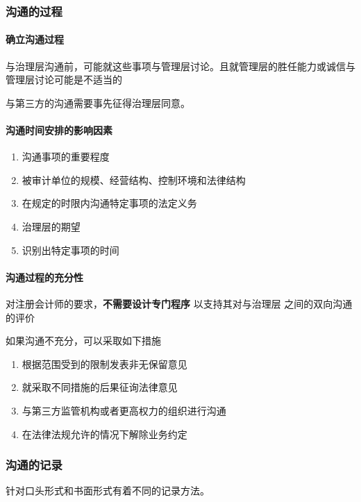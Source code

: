 \documentclass[UTF8,12pt]{ctexart}
\numberwithin{equation}{section} %
\numberwithin{figure}{section}
\numberwithin{table}{section}
\begin{document}
	\subsubsection{沟通的过程}
	\paragraph{确立沟通过程}
	与治理层沟通前，可能就这些事项与管理层讨论。且就管理层的胜任能力或诚信与管理层讨论可能是不适当的
	
	与第三方的沟通需要事先征得治理层同意。
	
	\paragraph{沟通时间安排的影响因素}
	\begin{enumerate}
		\item 沟通事项的重要程度
		
		\item 被审计单位的规模、经营结构、控制环境和法律结构   
		
		\item 在规定的时限内沟通特定事项的法定义务
		
		\item 治理层的期望
		
		\item 识别出特定事项的时间
	\end{enumerate}
	
	
	\paragraph{沟通过程的充分性}
	对注册会计师的要求，\textbf{不需要设计专门程序}  以支持其对与治理层 之间的双向沟通的评价
	
	如果沟通不充分，可以采取如下措施
	\begin{enumerate}
		\item 根据范围受到的限制发表非无保留意见
		
		\item 就采取不同措施的后果征询法律意见
		
		\item 与第三方监管机构或者更高权力的组织进行沟通
		
		\item 在法律法规允许的情况下解除业务约定
	\end{enumerate}
	
	
	
	\subsubsection{沟通的记录}
	针对口头形式和书面形式有着不同的记录方法。
	
\end{document}
